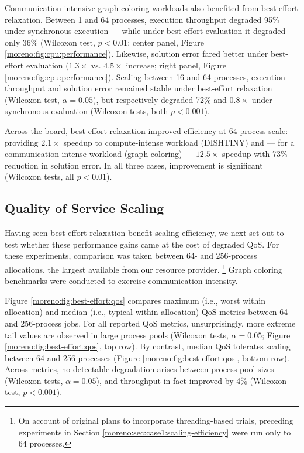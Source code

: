 Communication-intensive graph-coloring workloads also benefited from best-effort relaxation.
Between 1 and 64 processes, execution throughput degraded 95\% under synchronous execution --- while under best-effort evaluation it degraded only 36\% (Wilcoxon test, $p < 0.01$; center panel, Figure \ref{moreno:fig:cpu:performance}).
Likewise, solution error fared better under best-effort evaluation ($1.3\times$ vs. $4.5\times$ increase; right panel, Figure \ref{moreno:fig:cpu:performance}).
Scaling between 16 and 64 processes, execution throughput and solution error remained stable under best-effort relaxation (Wilcoxon test, $\alpha = 0.05$), but respectively degraded 72\% and $0.8\times$ under synchronous evaluation (Wilcoxon tests, both $p < 0.001$).

Across the board, best-effort relaxation improved efficiency at 64-process scale: providing $2.1\times$ speedup to compute-intense workload (DISHTINY) and --- for a communication-intense workload (graph coloring) --- $12.5\times$ speedup with 73\% reduction in solution error.
In all three cases, improvement is significant (Wilcoxon tests, all $p < 0.01$).

\subsection{Quality of Service Scaling}
\label{moreno:sec:case1:qos-scaling}

Having seen best-effort relaxation benefit scaling efficiency, we next set out to test whether these performance gains came at the cost of degraded QoS.
For these experiments, comparison was taken between 64- and 256-process allocations, the largest available from our resource provider.
\unskip\footnote{%
On account of original plans to incorporate threading-based trials, preceding experiments in Section \ref{moreno:sec:case1:scaling-efficiency} were run only to 64 processes.
}
Graph coloring benchmarks were conducted to exercise communication-intensity.

Figure \ref{moreno:fig:best-effort:qos} compares maximum (i.e., worst within allocation) and median (i.e., typical within allocation) QoS metrics between 64- and 256-process jobs.
For all reported QoS metrics, unsurprisingly, more extreme tail values are observed in large process pools (Wilcoxon tests, $\alpha = 0.05$; Figure \ref{moreno:fig:best-effort:qos}, top row).
By contrast, median QoS tolerates scaling between 64 and 256 processes (Figure \ref{moreno:fig:best-effort:qos}, bottom row).
Across metrics, no detectable degradation arises between process pool sizes (Wilcoxon tests, $\alpha = 0.05$), and throughput in fact improved by 4\% (Wilcoxon test, $p < 0.001$).

